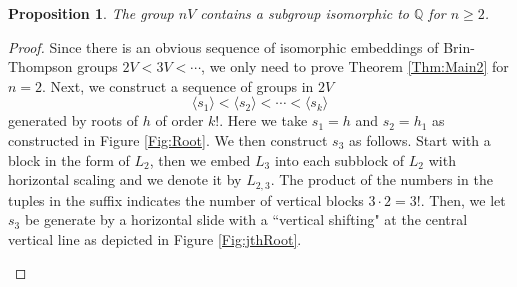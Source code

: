 \documentclass[12pt,reqno]{amsart}
\theoremstyle{plain}
\newtheorem{proposition}[theorem]{Proposition}
\theoremstyle{definition}
\theoremstyle{remark}
\numberwithin{equation}{section}
\begin{document}
%
\begin{proposition}\label{Prop:QEmbeds2V}
       The group $nV$  contains a subgroup isomorphic to  $\mathbb{Q}$ for $n \geq 2 $.
\end{proposition}
\begin{proof} 
         Since there is an obvious sequence of isomorphic embeddings of 
         Brin-Thompson groups  $2V < 3V < \cdots$, 
         we only need to prove Theorem  \ref{Thm:Main2}  for  $n = 2$. 
 	Next, we construct a sequence of groups in $2V$
	\begin{equation}\label{Eq:seq} 
		\langle s_1 \rangle  <  \langle s_2 \rangle  < \cdots <  \langle s_k \rangle 
	\end{equation}
	generated by roots of  $h$  of order $k!$.
	Here we take $s_1 = h$ and $s_2 = h_1$ 
	as constructed in Figure \ref{Fig:Root}.
	We then construct $s_3$ as follows.   
	Start with a block in the form of  $L_2$, 
	then we embed  $L_3$  into each subblock of $L_2$  with horizontal scaling 
	and we denote it by $L_{2,3}$.  
	The product of the numbers in the tuples in the suffix 
	indicates the number of vertical blocks  $3\cdot 2 = 3!$.  
	Then, 
	we let  $s_3$  be generate by a horizontal slide with  
	a ``vertical shifting" at the central vertical line
	as depicted in Figure \ref{Fig:jthRoot}.
 	\begin{figure}[htp]
		\begin{center}
\end{center}
\end{figure}
\end{proof}
\end{document}
